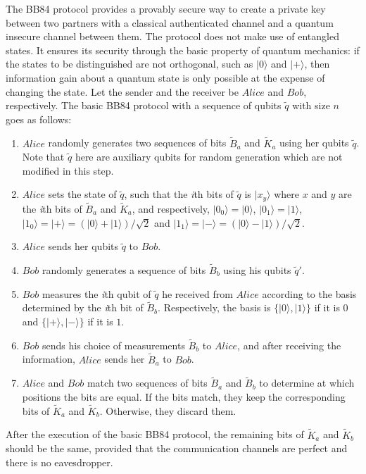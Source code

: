 \documentclass[runningheads]{llncs}
\begin{document}
The BB84 protocol provides a provably secure way to create a private key between two partners with a classical authenticated channel and a quantum insecure
channel between them. The protocol does not make use of entangled states. It ensures its security through the basic property of quantum mechanics: if the states to be distinguished are not orthogonal, such as $|0\rangle$ and $|+\rangle$, then information gain about a quantum state is only possible at the expense of changing the state. Let the sender and the receiver be $Alice$ and $Bob$, respectively. The basic BB84 protocol with a sequence of qubits $\tilde{q}$ with size $n$ goes as follows:
\begin{enumerate}
	\item $Alice$ randomly generates two sequences of bits $\tilde{B}_a$ and $\tilde{K}_a$ using her qubits $\tilde{q}$. Note that $\tilde{q}$ here are auxiliary qubits for random generation which are not modified in this step.
	\item $Alice$ sets the state of $\tilde{q}$, such that the \textit{i}th bits of $\tilde{q}$ is $|x_{y}\rangle$ where $x$ and $y$ are the \textit{i}th bits of $\tilde{B}_a$ and $\tilde{K}_a$, and respectively, $|0_0\rangle=|0\rangle$, $|0_1\rangle=|1\rangle$, $|1_0\rangle=|+\rangle=(|0\rangle+|1\rangle)/\sqrt{2}$ and $|1_1\rangle=|-\rangle=(|0\rangle-|1\rangle)/\sqrt{2}$.
	\item $Alice$ sends her qubits $\tilde{q}$ to $Bob$.
	\item $Bob$ randomly generates a sequence of bits $\tilde{B}_b$ using his qubits $\tilde{q}'$.
	\item $Bob$ measures the \textit{i}th qubit of $\tilde{q}$ he received from $Alice$ according to the basis determined by the \textit{i}th bit of $\tilde{B}_b$. Respectively, the basis is $\{|0\rangle,|1\rangle\}$ if it is $0$ and $\{|+\rangle,|-\rangle\}$ if it is $1$.
	\item $Bob$ sends his choice of measurements $\tilde{B}_{b}$ to $Alice$, and after receiving the information, $Alice$ sends her $\tilde{B}_{a}$ to $Bob$.
	\item $Alice$ and $Bob$ match two sequences of bits $\tilde{B}_{a}$ and $\tilde{B}_{b}$ to determine at which positions the bits are equal. If the bits match, they keep the corresponding bits of $\tilde{K}_a$ and $\tilde{K}_b$. Otherwise, they discard them.
\end{enumerate}
After the execution of the basic BB84 protocol, the remaining bits of $\tilde{K}_a$ and $\tilde{K}_b$ should be the same, provided that the communication channels are perfect and there is no eavesdropper.
\end{document}
